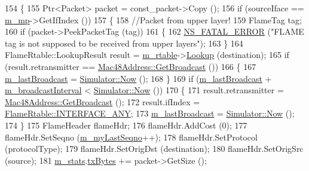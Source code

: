\begin{DoxyCode}
154 \{
155   Ptr<Packet> packet = const\_packet->Copy ();
156   \textcolor{keywordflow}{if} (sourceIface == \hyperlink{classns3_1_1MeshL2RoutingProtocol_af4ebb2340b72dfc607ddf3c1ae65b54a}{m\_mp}->GetIfIndex ())
157     \{
158       \textcolor{comment}{//Packet from upper layer!}
159       FlameTag tag;
160       \textcolor{keywordflow}{if} (packet->PeekPacketTag (tag))
161         \{
162           \hyperlink{group__fatal_ga5131d5e3f75d7d4cbfd706ac456fdc85}{NS\_FATAL\_ERROR} (\textcolor{stringliteral}{"FLAME tag is not supposed to be received from upper layers"});
163         \}
164       FlameRtable::LookupResult result = \hyperlink{classns3_1_1flame_1_1FlameProtocol_a6165f21594140afd0df03510fb61eb33}{m\_rtable}->\hyperlink{classns3_1_1flame_1_1FlameRtable_a0325101feac0af5e36ed5e29d2e7e74a}{Lookup} (destination);
165       \textcolor{keywordflow}{if} (result.retransmitter == \hyperlink{classns3_1_1Mac48Address_a55156e302c6bf950c0b558365adbde84}{Mac48Address::GetBroadcast} ())
166         \{
167           \hyperlink{classns3_1_1flame_1_1FlameProtocol_a9ea666e71f74654772318563e939df7f}{m\_lastBroadcast} = \hyperlink{classns3_1_1Simulator_ac3178fa975b419f7875e7105be122800}{Simulator::Now} ();
168         \}
169       \textcolor{keywordflow}{if} (\hyperlink{classns3_1_1flame_1_1FlameProtocol_a9ea666e71f74654772318563e939df7f}{m\_lastBroadcast} + \hyperlink{classns3_1_1flame_1_1FlameProtocol_a1c150d8b0802a20889fd125b804b24e2}{m\_broadcastInterval} < 
      \hyperlink{classns3_1_1Simulator_ac3178fa975b419f7875e7105be122800}{Simulator::Now} ())
170         \{
171           result.retransmitter = \hyperlink{classns3_1_1Mac48Address_a55156e302c6bf950c0b558365adbde84}{Mac48Address::GetBroadcast} ();
172           result.ifIndex = \hyperlink{classns3_1_1flame_1_1FlameRtable_a355b8bbdfec725bb9ccfddc8f3302573}{FlameRtable::INTERFACE\_ANY};
173           \hyperlink{classns3_1_1flame_1_1FlameProtocol_a9ea666e71f74654772318563e939df7f}{m\_lastBroadcast} = \hyperlink{classns3_1_1Simulator_ac3178fa975b419f7875e7105be122800}{Simulator::Now} ();
174         \}
175       FlameHeader flameHdr;
176       flameHdr.AddCost (0);
177       flameHdr.SetSeqno (\hyperlink{classns3_1_1flame_1_1FlameProtocol_a51d2e538c9c79ad9ab1dff63a957515f}{m\_myLastSeqno}++);
178       flameHdr.SetProtocol (protocolType);
179       flameHdr.SetOrigDst (destination);
180       flameHdr.SetOrigSrc (source);
181       \hyperlink{classns3_1_1flame_1_1FlameProtocol_a9f33727e9f2483dc9d929a7a82956e0c}{m\_stats}.\hyperlink{structns3_1_1flame_1_1FlameProtocol_1_1Statistics_a6e9193135a5ce66fc2195afe99118bb9}{txBytes} += packet->GetSize ();

\end{DoxyCode}

